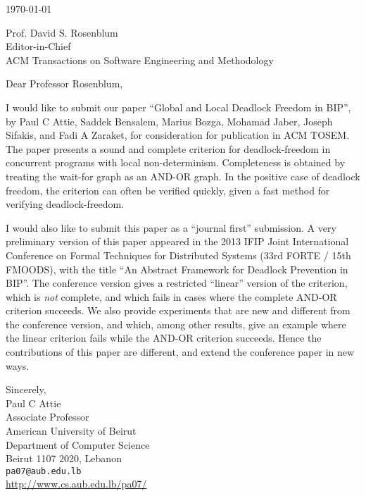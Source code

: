 \documentclass[11pt]{article}
\begin{document}
\noindent
\today


\noindent
Prof. David S. Rosenblum\\
Editor-in-Chief\\
ACM Transactions on Software Engineering and Methodology\\




\vspace{0.1in}

\noindent
Dear Professor Rosenblum,

I would like to submit our paper ``Global and Local Deadlock Freedom
in BIP'', by Paul C Attie, Saddek Bensalem, Marius Bozga, Mohamad
Jaber, Joseph Sifakis, and Fadi A Zaraket, for consideration for publication in ACM TOSEM. 
The paper presents a sound and complete criterion for deadlock-freedom in concurrent programs with local non-determinism. 
Completeness is obtained by treating the wait-for graph as an AND-OR graph.
In the positive case of deadlock freedom, the criterion can often be verified quickly, given a fast method for verifying deadlock-freedom.

I would also like to submit this paper as a ``journal first'' submission. A very preliminary version of this paper appeared in the 
2013 IFIP Joint International Conference on Formal Techniques for Distributed Systems (33rd FORTE / 15th FMOODS), 
with the title ``An Abstract Framework for Deadlock Prevention in BIP''. 
The conference version gives a restricted ``linear'' version of the criterion, which is \emph{not} complete, and which fails in cases where the 
complete AND-OR criterion succeeds. We also provide experiments that are new and different from the conference version, and which, among other
results, give an example where the linear criterion fails while the AND-OR criterion succeeds.
Hence the contributions of this paper are different, and extend the conference paper in new ways.



\noindent
Sincerely,\\[0.1in]
Paul C Attie\\
Associate Professor\\
American University of Beirut\\
Department of Computer Science\\
Beirut 1107 2020, Lebanon\\[1ex]
\texttt{pa07@aub.edu.lb}\\
\url{http://www.cs.aub.edu.lb/pa07/}
\end{document}
